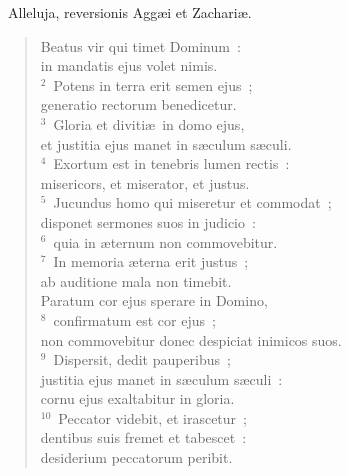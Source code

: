 ~\lettrine[lines=10,image=true,loversize=0.05,lraise=-0.03]{A}{}lleluja, reversionis Agg\ae i et Zachari\ae . \begin{flushleft}\begin{verse}\vspace{6pt}Beatus vir qui timet Dominum~:\\ in mandatis ejus volet nimis.\\
${}^{2}$~Potens in terra erit semen ejus~;\\ generatio rectorum benedicetur.\\
${}^{3}$~Gloria et diviti\ae\ in domo ejus,\\ et justitia ejus manet in s\ae culum s\ae culi.\\
${}^{4}$~Exortum est in tenebris lumen rectis~:\\ misericors, et miserator, et justus.\\
${}^{5}$~Jucundus homo qui miseretur et commodat~;\\ disponet sermones suos in judicio~:\\
${}^{6}$~quia in \ae ternum non commovebitur.\\
${}^{7}$~In memoria \ae terna erit justus~;\\ ab auditione mala non timebit.\\ Paratum cor ejus sperare in Domino,\\
${}^{8}$~confirmatum est cor ejus~;\\ non commovebitur donec despiciat inimicos suos.\\
${}^{9}$~Dispersit, dedit pauperibus~;\\ justitia ejus manet in s\ae culum s\ae culi~:\\ cornu ejus exaltabitur in gloria.\\
${}^{10}$~Peccator videbit, et irascetur~;\\ dentibus suis fremet et tabescet~:\\ desiderium peccatorum peribit.\end{verse}\end{flushleft}


